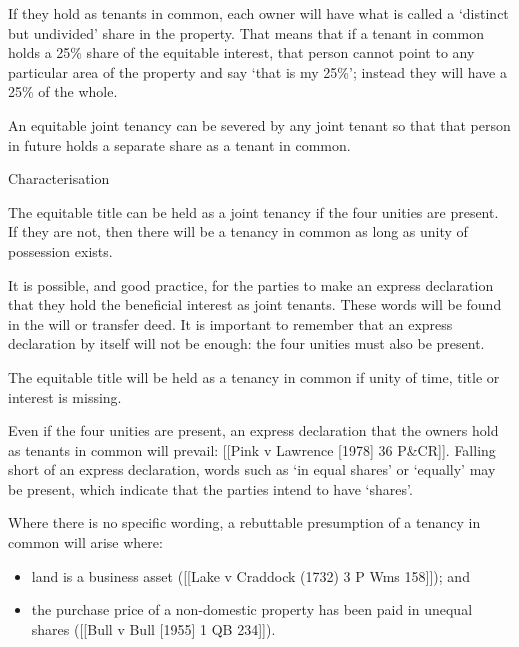 \documentclass[
]{article}
\providecommand{\tightlist}{%
  \setlength{\itemsep}{0pt}\setlength{\parskip}{0pt}}
\begin{document}
If they hold as tenants in common, each owner will have what is called a
`distinct but undivided' share in the property. That means that if a
tenant in common holds a 25\% share of the equitable interest, that
person cannot point to any particular area of the property and say `that
is my 25\%'; instead they will have a 25\% of the whole.

An equitable joint tenancy can be severed by any joint tenant so that
that person in future holds a separate share as a tenant in common.

Characterisation

The equitable title can be held as a joint tenancy if the four unities
are present. If they are not, then there will be a tenancy in common as
long as unity of possession exists.

It is possible, and good practice, for the parties to make an express
declaration that they hold the beneficial interest as joint tenants.
These words will be found in the will or transfer deed. It is important
to remember that an express declaration by itself will not be enough:
the four unities must also be present.

The equitable title will be held as a tenancy in common if unity of
time, title or interest is missing.

Even if the four unities are present, an express declaration that the
owners hold as tenants in common will prevail: {[}{[}Pink v Lawrence
{[}1978{]} 36 P\&CR{]}{]}. Falling short of an express declaration,
words such as `in equal shares' or `equally' may be present, which
indicate that the parties intend to have `shares'.

Where there is no specific wording, a rebuttable presumption of a
tenancy in common will arise where:

\begin{itemize}
\tightlist
\item
  land is a business asset ({[}{[}Lake v Craddock (1732) 3 P Wms
  158{]}{]}); and
\item
  the purchase price of a non-domestic property has been paid in unequal
  shares ({[}{[}Bull v Bull {[}1955{]} 1 QB 234{]}{]}).
\end{itemize}
\end{document}
